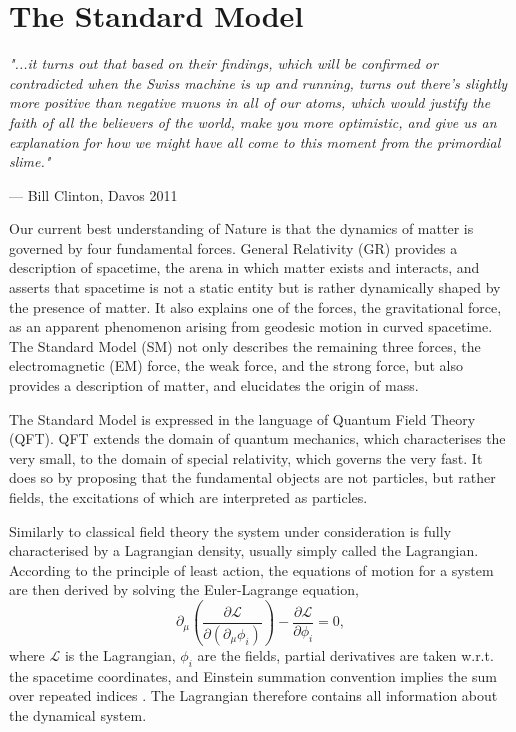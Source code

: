 \chapter{The Standard Model}

\textit{"...it turns out that based on their findings, which will be confirmed
or contradicted when the Swiss machine is up and running, turns out there's
slightly more positive than negative muons in all of our atoms, which would
justify the faith of all the believers of the world, make you more
optimistic, and give us an explanation for how we might have all come to this
moment from the primordial slime."}
\vspace{5mm}
\begin{flushright}
--- Bill Clinton, Davos 2011
\end{flushright}

\thispagestyle{empty}
\newpage

\noindent
Our current best understanding of Nature is that the dynamics of matter is governed
by four fundamental forces. General Relativity (GR) provides a
description of spacetime, the arena in which matter exists and interacts, and asserts
that spacetime is not a static entity but is rather dynamically shaped by the presence
of matter. It also explains one of the forces, the gravitational force, as an apparent
phenomenon arising from geodesic motion in curved spacetime. The Standard Model
(SM) not only describes the remaining three forces, the electromagnetic (EM) force,
the weak force, and the strong force, but also provides a description of matter, and 
elucidates the origin of mass.

The Standard Model is expressed in the language of Quantum Field Theory (QFT). QFT 
extends the domain of quantum mechanics, which characterises the very small, to
the domain of special relativity, which governs the very fast. It does so by
proposing that the fundamental objects are not particles, but rather fields, the
excitations of which are interpreted as particles.

Similarly to classical field theory the system under consideration is fully characterised
by a Lagrangian density, usually simply called the Lagrangian. According to
the principle of least action, the equations of motion for a system are then derived
by solving the Euler-Lagrange equation,
\begin{equation}
\partial_\mu \left(\frac{\partial \mathcal{L}}{\partial(\partial_\mu \phi_i)}\right)
- \frac{\partial{\mathcal{L}}}{\partial \phi_i} = 0,
\end{equation}
where $\mathcal{L}$ is the Lagrangian, $\phi_i$ are the fields, partial derivatives
are taken w.r.t. the spacetime coordinates, and Einstein summation convention implies
the sum over repeated indices \cite{Thomson:2013zua}. The Lagrangian therefore contains all
information about the dynamical system. 


